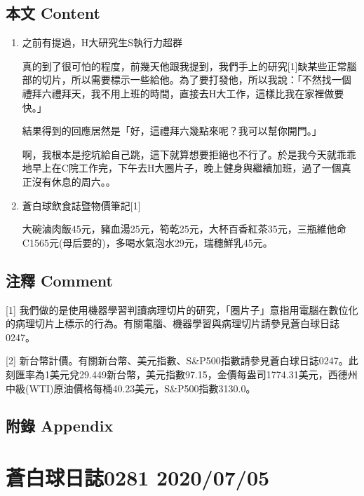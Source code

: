 \documentclass[
]{article}
\begin{document}
\hypertarget{ux672cux6587-content-3}{%
\subsection{本文 Content}\label{ux672cux6587-content-3}}

\begin{enumerate}
\def\labelenumi{\arabic{enumi}.}
\item
  之前有提過，H大研究生S執行力超群

  真的到了很可怕的程度，前幾天他跟我提到，我們手上的研究{[}1{]}缺某些正常腦部的切片，所以需要標示一些給他。為了要打發他，所以我說：「不然找一個禮拜六禮拜天，我不用上班的時間，直接去H大工作，這樣比我在家裡做要快。」

  結果得到的回應居然是「好，這禮拜六幾點來呢？我可以幫你開門。」

  啊，我根本是挖坑給自己跳，這下就算想要拒絕也不行了。於是我今天就乖乖地早上在C院工作完，下午去H大圈片子，晚上健身與繼續加班，過了一個真正沒有休息的周六。。
\item
  蒼白球飲食誌暨物價筆記{[}1{]}

  大碗滷肉飯45元，豬血湯25元，筍乾25元，大杯百香紅茶35元，三瓶維他命C1565元(母后要的)，多喝水氣泡水29元，瑞穗鮮乳45元。
\end{enumerate}

\hypertarget{ux6ce8ux91cb-comment-3}{%
\subsection{注釋 Comment}\label{ux6ce8ux91cb-comment-3}}

{[}1{]}
我們做的是使用機器學習判讀病理切片的研究，「圈片子」意指用電腦在數位化的病理切片上標示的行為。有關電腦、機器學習與病理切片請參見蒼白球日誌0247。

{[}2{]}
新台幣計價。有關新台幣、美元指數、S\&P500指數請參見蒼白球日誌0247。此刻匯率為1美元兌29.449新台幣，美元指數97.15，金價每盎司1774.31美元，西德州中級(WTI)原油價格每桶40.23美元，S\&P500指數3130.0。

\hypertarget{ux9644ux9304-appendix-3}{%
\subsection{附錄 Appendix}\label{ux9644ux9304-appendix-3}}

\hypertarget{ux84bcux767dux7403ux65e5ux8a8c0281-20200705}{%
\section{蒼白球日誌0281
2020/07/05}\label{ux84bcux767dux7403ux65e5ux8a8c0281-20200705}}
\end{document}
